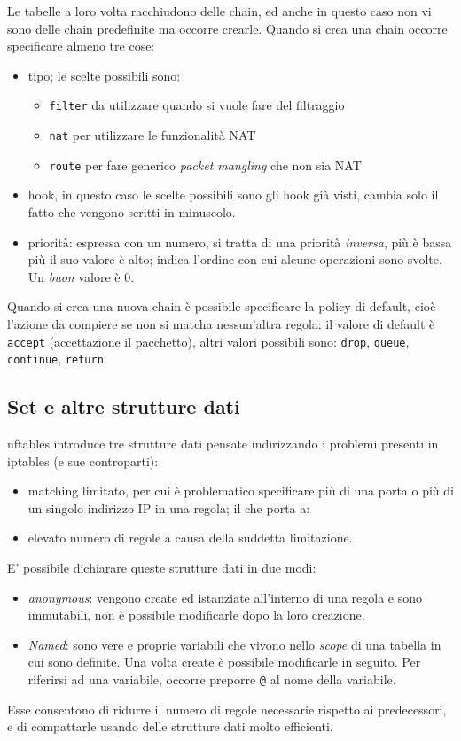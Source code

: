 Le tabelle a loro volta racchiudono delle chain, ed anche in questo caso non vi
sono delle chain predefinite ma occorre crearle. Quando si crea una chain occorre
specificare
almeno tre cose:
\begin{itemize}
  \item tipo; le scelte possibili sono:
  \begin{itemize}
    \item \texttt{filter} da utilizzare quando si vuole fare del filtraggio
    \item \texttt{nat} per utilizzare le funzionalità NAT
    \item \texttt{route} per fare generico \textit{packet mangling} che non sia NAT
  \end{itemize}
  \item hook, in questo caso le scelte possibili sono gli hook già visti, cambia solo
  il fatto che vengono scritti in minuscolo.
  \item priorità: espressa con un numero, si tratta di una priorità \textit{inversa},
  più è bassa più il suo valore è alto; indica l'ordine con cui alcune operazioni
  sono svolte. Un \textit{buon} valore è 0.
\end{itemize}

Quando si crea una nuova chain è possibile specificare la policy di default, cioè
l'azione da compiere se non si matcha nessun'altra regola; il valore di default è
\texttt{accept} (accettazione il pacchetto), altri valori possibili sono: \texttt{drop},
\texttt{queue}, \texttt{continue}, \texttt{return}.


\subsection{Set e altre strutture dati}
nftables introduce tre strutture dati pensate indirizzando i problemi
presenti in iptables (e sue controparti):
\begin{itemize}
  \item matching limitato, per cui è problematico specificare più di una porta
  o più di un singolo indirizzo IP in una regola; il che porta a:
  \item elevato numero di regole a causa della suddetta limitazione.
\end{itemize}
E' possibile dichiarare queste strutture dati in due modi:
\begin{itemize}
  \item \textit{anonymous}: vengono create ed istanziate all'interno di una regola
  e sono immutabili, non è possibile modificarle dopo la loro creazione.
  \item \textit{Named}: sono vere e proprie variabili che vivono nello \textit{scope}
  di una tabella in cui sono definite. Una volta create è possibile modificarle
  in seguito. Per riferirsi ad una variabile, occorre preporre \texttt{@} al nome
  della variabile.
\end{itemize}
Esse consentono di ridurre il numero di regole necessarie rispetto
ai predecessori, e di compattarle usando delle strutture dati molto efficienti.

